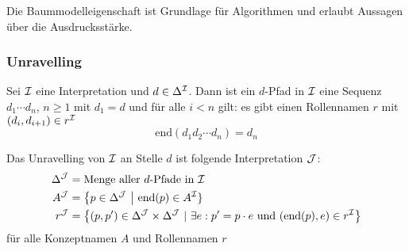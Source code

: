 Die Baummodelleigenschaft ist Grundlage für Algorithmen und erlaubt Aussagen über die Ausdrucksstärke.

\subsubsection{Unravelling}\label{unravelling}

Sei $\mathcal{I}$ eine Interpretation und $d \in \Delta^{\mathcal{I}}$. 
Dann ist ein $d$-Pfad in $\mathcal{I}$ eine Sequenz $d_1\cdots d_n$, $n \geq 1$ mit $d_1 = d$ und
für alle $i < n$ gilt: es gibt einen Rollennamen $r$ mit $(d_i, d_{i + 1}) \in r^{\mathcal{I}}$
\[\text{end}(d_1d_2\cdots d_n) = d_n\]

\begin{definition}[Unravelling]
Das Unravelling von $\mathcal{I}$ an Stelle $d$ ist folgende Interpretation $\mathcal{J}$:
\begin{align*}
    \Delta^{\MJ} &= \text{Menge aller }d\text{-Pfade in }\MI\\
    A^{\MJ} &= \left\{ p \in \Delta^{\MJ}\  \right|\text{\ end}\left( p \right) \in A^\MI\}\\
    r^{\MJ} &= \left\{ \left( p,p' \right) \in \Delta^{\MJ} \times \Delta^{\MJ}\ |\ \exists e:p' = p \cdot e\ \mathrm{\text{und}}\ \left( \text{end}\left( p \right),e \right) \in r^\MI \right\}
\end{align*}
für alle Konzeptnamen $A$ und Rollennamen $r$
\end{definition}

